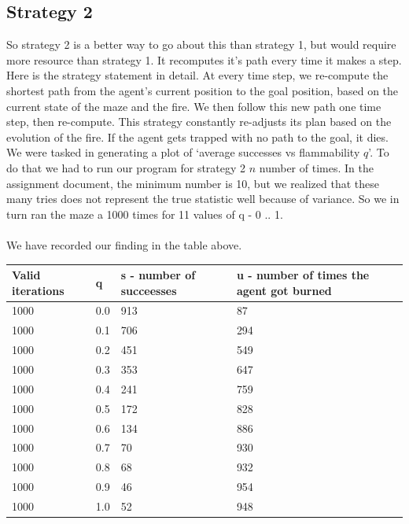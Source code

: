 \documentclass[11pt]{scrartcl} %
\begin{document}
\subsection{Strategy 2}
So strategy 2 is a better way to go about this than strategy 1, but would require more resource than strategy 1. It recomputes it's path every time it makes a step. Here is the strategy statement in detail. At every time step, we re-compute the shortest path from the agent’s current position to the goal position, based on  the  current  state  of  the  maze  and  the  fire.  We then follow  this  new  path  one  time  step,  then  re-compute.   This strategy constantly re-adjusts its plan based on the evolution of the fire.  If the agent gets trapped with no path to the goal, it dies.
\vspace{2em}\\
We were tasked in generating a plot of ‘average successes vs flammability $q$’. To do that we had to run our program for strategy 2 $n$ number of times. In the assignment document, the minimum number is 10, but we realized that these many tries does not represent the true statistic well because of variance. So we in turn ran the maze a 1000 times for 11 values of q - 0 .. 1. \\
\pagebreak\\
We have recorded our finding in the table above.\\
\begin{table}[]
\begin{tabular}{|l|l|l|l|}
\hline
\textbf{Valid iterations} & \textbf{q} & \textbf{s - number of succeesses} & \textbf{u - number of times the agent got burned} \\ \hline
1000 & 0.0   & 913 & 87  \\ \hline
1000 & 0.1 & 706 & 294 \\ \hline
1000 & 0.2 & 451 & 549 \\ \hline
1000 & 0.3 & 353 & 647 \\ \hline
1000 & 0.4 & 241 & 759 \\ \hline
1000 & 0.5 & 172 & 828 \\ \hline
1000 & 0.6 & 134 & 886 \\ \hline
1000 & 0.7 & 70  & 930 \\ \hline
1000 & 0.8 & 68  & 932 \\ \hline
1000 & 0.9 & 46  & 954 \\ \hline
1000 & 1.0 & 52  & 948 \\ \hline
\end{tabular}
\end{table}\\
\end{document}
